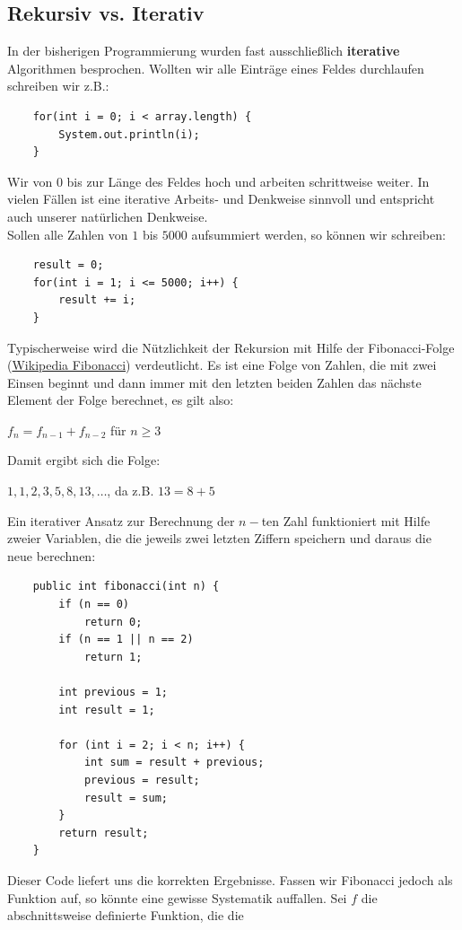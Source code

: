 \documentclass{article}
\begin{document}
\subsection{Rekursiv vs. Iterativ}
In der bisherigen Programmierung wurden fast ausschließlich \textbf{iterative} Algorithmen besprochen. 
Wollten wir alle Einträge eines Feldes durchlaufen schreiben wir z.B.: 
\begin{verbatim}
    for(int i = 0; i < array.length) {
        System.out.println(i);
    }
\end{verbatim}
Wir  von 0 bis zur Länge des Feldes hoch und arbeiten schrittweise weiter. In vielen Fällen 
ist eine iterative Arbeits- und Denkweise sinnvoll und entspricht auch unserer natürlichen Denkweise. \\
Sollen alle Zahlen von $1$ bis $5000$ aufsummiert werden, so können wir schreiben:
\begin{verbatim}
    result = 0;
    for(int i = 1; i <= 5000; i++) {
        result += i;
    }
\end{verbatim}
Typischerweise wird die Nützlichkeit der Rekursion mit Hilfe der Fibonacci-Folge (\href{https://de.wikipedia.org/wiki/Fibonacci-Folge}{Wikipedia Fibonacci}) 
verdeutlicht. Es ist eine Folge von Zahlen, die mit zwei Einsen beginnt und dann immer mit den letzten beiden
Zahlen das nächste Element der Folge berechnet, es gilt also: 
\begin{center}
    $f_n = f_{n-1} + f_{n-2}$ für $n\geq 3$
\end{center}
Damit ergibt sich die Folge:
\begin{center}
    $1, 1, 2, 3, 5, 8, 13, \dots$, da z.B. $13 = 8 + 5$
\end{center}
Ein iterativer Ansatz zur Berechnung der $n-$ten Zahl funktioniert mit Hilfe zweier Variablen, die die 
jeweils zwei letzten Ziffern speichern und daraus die neue berechnen: 
\begin{verbatim}
    public int fibonacci(int n) {
        if (n == 0)
            return 0;
        if (n == 1 || n == 2)
            return 1;

        int previous = 1;
        int result = 1;

        for (int i = 2; i < n; i++) {
            int sum = result + previous;
            previous = result;
            result = sum;
        }
        return result;
    }
\end{verbatim}
Dieser Code liefert uns die korrekten Ergebnisse. Fassen wir Fibonacci jedoch als Funktion auf, so 
könnte eine gewisse Systematik auffallen. Sei $f$ die abschnittsweise definierte Funktion, die die 
\end{document}
